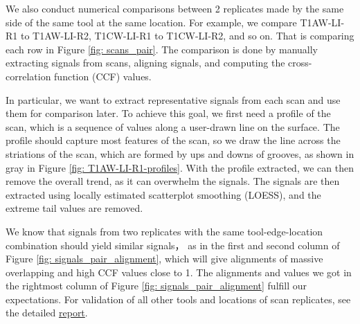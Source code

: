 \documentclass[fleqn,10pt]{wlscirep}
\begin{document}
We also conduct numerical comparisons between 2 replicates made by the
same side of the same tool at the same location. For example, we compare
T1AW-LI-R1 to T1AW-LI-R2, T1CW-LI-R1 to T1CW-LI-R2, and so on. That is
comparing each row in Figure \ref{fig: scans_pair}. The comparison is
done by manually extracting signals from scans, aligning signals, and
computing the cross-correlation function (CCF) values.

In particular, we want to extract representative signals from each scan
and use them for comparison later. To achieve this goal, we first need a
profile of the scan, which is a sequence of values along a user-drawn
line on the surface. The profile should capture most features of the
scan, so we draw the line across the striations of the scan, which are
formed by ups and downs of grooves, as shown in gray in Figure
\ref{fig: T1AW-LI-R1-profiles}. With the profile extracted, we can then
remove the overall trend, as it can overwhelm the signals. The signals
are then extracted using locally estimated scatterplot smoothing
(LOESS), and the extreme tail values are removed.

We know that signals from two replicates with the same
tool-edge-location combination should yield similar signals， as in the
first and second column of Figure \ref{fig: signals_pair_alignment},
which will give alignments of massive overlapping and high CCF values
close to 1. The alignments and values we got in the rightmost column of
Figure \ref{fig: signals_pair_alignment} fulfill our expectations. For
validation of all other tools and locations of scan replicates, see the
detailed
\href{https://heike.github.io/Wirecuts/data-descriptor/Technical_Validation.html}{report}.
\end{document}
